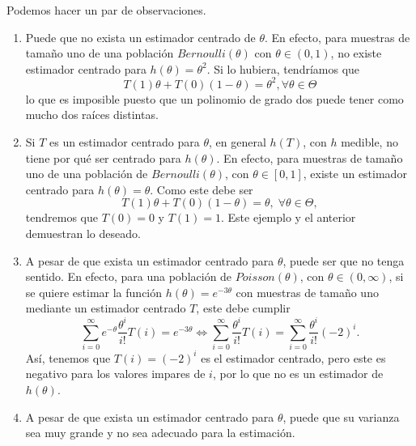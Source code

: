 \begin{observation}
Podemos hacer un par de observaciones.
\begin{enumerate}
\item Puede que no exista un estimador centrado de $\displaystyle \theta $. En efecto, para muestras de tamaño uno de una población $\displaystyle Bernoulli\left(\theta \right) $ con $\displaystyle \theta \in \left(0,1\right) $, no existe estimador centrado para $\displaystyle h\left(\theta \right)=\theta^{2} $. Si lo hubiera, tendríamos que
	\[T\left(1\right)\theta + T\left(0\right)\left(1-\theta \right)=\theta^{2} , \forall\theta\in \Theta\]
	lo que es imposible puesto que un polinomio de grado dos puede tener como mucho dos raíces distintas. 
\item Si $\displaystyle T $ es un estimador centrado para $\displaystyle \theta $, en general $\displaystyle h\left(T\right) $, con $\displaystyle h $ medible, no tiene por qué ser centrado para $\displaystyle h\left(\theta\right) $. En efecto, para muestras de tamaño uno de una población de $\displaystyle Bernoulli\left(\theta \right) $, con $\displaystyle \theta \in \left[0,1\right]  $, existe un estimador centrado para $\displaystyle h\left(\theta\right)=\theta $. Como este debe ser
	\[T\left(1\right)\theta+T\left(0\right)\left(1-\theta \right)=\theta, \; \forall \theta \in \Theta ,\]
	tendremos que $\displaystyle T\left(0\right)=0 $ y $\displaystyle T\left(1\right)=1 $. Este ejemplo y el anterior demuestran lo deseado. 
\item A pesar de que exista un estimador centrado para $\displaystyle \theta $, puede ser que no tenga sentido. En efecto, para una población de $\displaystyle Poisson\left(\theta \right) $, con $\displaystyle \theta \in \left(0, \infty\right) $, si se quiere estimar la función $\displaystyle h\left(\theta \right)=e^{-3\theta } $ con muestras de tamaño uno mediante un estimador centrado $\displaystyle T $, este debe cumplir
	\[\sum^{\infty}_{i = 0}e^{-\theta }\frac{\theta^{i}}{i!}T\left(i\right)=e^{-3\theta } \iff \sum^{\infty}_{i = 0}\frac{\theta^{i}}{i!}T\left(i\right)=\sum^{\infty}_{i = 0}\frac{\theta^{i}}{i!}\left(-2\right)^{i} .\]
Así, tenemos que $\displaystyle T\left(i \right)=\left(-2\right)^{i} $ es el estimador centrado, pero este es negativo para los valores impares de $\displaystyle i $, por lo que no es un estimador de $\displaystyle h\left(\theta \right) $. 	
\item A pesar de que exista un estimador centrado para $\displaystyle \theta $, puede que su varianza sea muy grande y no sea adecuado para la estimación.
\end{enumerate}
\end{observation}
